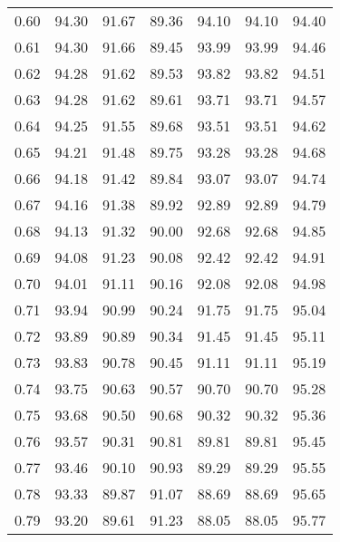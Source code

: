 \begin{tabular}{|c|c|c|c|c|c|c|}
      0.60 &     94.30 &     91.67 &      89.36 &   94.10 &      94.10 &         94.40 \\
      0.61 &     94.30 &     91.66 &      89.45 &   93.99 &      93.99 &         94.46 \\
      0.62 &     94.28 &     91.62 &      89.53 &   93.82 &      93.82 &         94.51 \\
      0.63 &     94.28 &     91.62 &      89.61 &   93.71 &      93.71 &         94.57 \\
      0.64 &     94.25 &     91.55 &      89.68 &   93.51 &      93.51 &         94.62 \\
      0.65 &     94.21 &     91.48 &      89.75 &   93.28 &      93.28 &         94.68 \\
      0.66 &     94.18 &     91.42 &      89.84 &   93.07 &      93.07 &         94.74 \\
      0.67 &     94.16 &     91.38 &      89.92 &   92.89 &      92.89 &         94.79 \\
      0.68 &     94.13 &     91.32 &      90.00 &   92.68 &      92.68 &         94.85 \\
      0.69 &     94.08 &     91.23 &      90.08 &   92.42 &      92.42 &         94.91 \\
      0.70 &     94.01 &     91.11 &      90.16 &   92.08 &      92.08 &         94.98 \\
      0.71 &     93.94 &     90.99 &      90.24 &   91.75 &      91.75 &         95.04 \\
      0.72 &     93.89 &     90.89 &      90.34 &   91.45 &      91.45 &         95.11 \\
      0.73 &     93.83 &     90.78 &      90.45 &   91.11 &      91.11 &         95.19 \\
      0.74 &     93.75 &     90.63 &      90.57 &   90.70 &      90.70 &         95.28 \\
      0.75 &     93.68 &     90.50 &      90.68 &   90.32 &      90.32 &         95.36 \\
      0.76 &     93.57 &     90.31 &      90.81 &   89.81 &      89.81 &         95.45 \\
      0.77 &     93.46 &     90.10 &      90.93 &   89.29 &      89.29 &         95.55 \\
      0.78 &     93.33 &     89.87 &      91.07 &   88.69 &      88.69 &         95.65 \\
      0.79 &     93.20 &     89.61 &      91.23 &   88.05 &      88.05 &         95.77 \\

\end{tabular}
